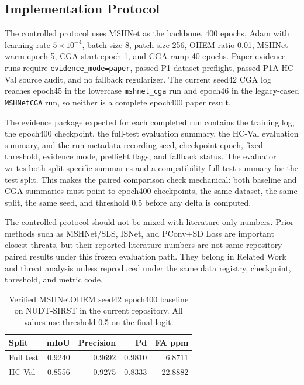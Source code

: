 \documentclass[letterpaper]{article}
\begin{document}
\subsection{Implementation Protocol}

The controlled protocol uses MSHNet as the backbone, 400 epochs, Adam with learning rate $5 \times 10^{-4}$, batch size 8, patch size 256, OHEM ratio 0.01, MSHNet warm epoch 5, CGA start epoch 1, and CGA ramp 40 epochs. Paper-evidence runs require \texttt{evidence\_mode=paper}, passed P1 dataset preflight, passed P1A HC-Val source audit, and no fallback regularizer. The current seed42 CGA log reaches epoch45 in the lowercase \texttt{mshnet\_cga} run and epoch46 in the legacy-cased \texttt{MSHNetCGA} run, so neither is a complete epoch400 paper result.

The evidence package expected for each completed run contains the training log, the epoch400 checkpoint, the full-test evaluation summary, the HC-Val evaluation summary, and the run metadata recording seed, checkpoint epoch, fixed threshold, evidence mode, preflight flags, and fallback status. The evaluator writes both split-specific summaries and a compatibility full-test summary for the test split. This makes the paired comparison check mechanical: both baseline and CGA summaries must point to epoch400 checkpoints, the same dataset, the same split, the same seed, and threshold 0.5 before any delta is computed.

The controlled protocol should not be mixed with literature-only numbers. Prior methods such as MSHNet/SLS, ISNet, and PConv+SD Loss are important closest threats, but their reported literature numbers are not same-repository paired results under this frozen evaluation path. They belong in Related Work and threat analysis unless reproduced under the same data registry, checkpoint, threshold, and metric code.

\begin{table}[t]
\centering
\caption{Verified MSHNetOHEM seed42 epoch400 baseline on NUDT-SIRST in the current repository. All values use threshold 0.5 on the final logit.}
\label{tab:ohem-baseline}
\small
\begin{tabular}{lrrrr}
\toprule
Split & mIoU & Precision & Pd & FA ppm \\
\midrule
Full test & 0.9240 & 0.9692 & 0.9810 & 6.8711 \\
HC-Val & 0.8556 & 0.9275 & 0.8333 & 22.8882 \\
\bottomrule
\end{tabular}
\end{table}
\end{document}
